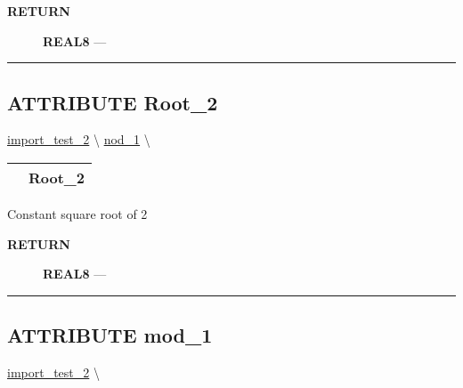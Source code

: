 \par
\begin{description}
\item [\colorbox{tagtype}{\color{white} \textbf{\textsf{RETURN}}}] \textbf{REAL8} --- 
\end{description}




\rule{\linewidth}{0.5pt}
\subsection*{\textsf{\colorbox{headtoc}{\color{white} ATTRIBUTE}
Root\_2}}

\hypertarget{ecldoc:constants.root_2}{}
\hspace{0pt} \hyperlink{ecldoc:import_test_2}{import_test_2} \textbackslash 
\hspace{0pt} \hyperlink{ecldoc:Constants}{nod_1} \textbackslash 

{\renewcommand{\arraystretch}{1.5}
\begin{tabularx}{\textwidth}{|>{\raggedright\arraybackslash}l|X|}
\hline
\hspace{0pt}\mytexttt{\color{red} } & \textbf{Root\_2} \\
\hline
\end{tabularx}
}

\par





Constant square root of 2








\par
\begin{description}
\item [\colorbox{tagtype}{\color{white} \textbf{\textsf{RETURN}}}] \textbf{REAL8} --- 
\end{description}




\rule{\linewidth}{0.5pt}


\subsection*{\textsf{\colorbox{headtoc}{\color{white} ATTRIBUTE}
mod\_1}}

\hypertarget{ecldoc:import_test_2.mod_1}{}
\hspace{0pt} \hyperlink{ecldoc:import_test_2}{import_test_2} \textbackslash 

